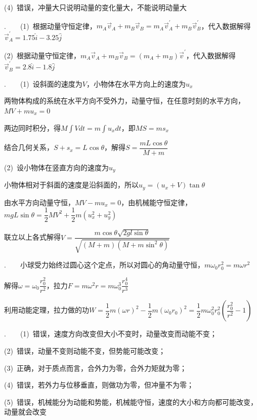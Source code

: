 (4)~错误，冲量大只说明动量的变化量大，不能说明动量大

\noindent\hdashrule{\textwidth}{1pt}{1pt}

.~~~~(1)~根据动量守恒定律，$m_A\vec{v}_A+m_B\vec{v}_B=m_A\vec{v}^\prime_A+m_B\vec{v}^\prime_B$，代入数据解得$\vec{v}^\prime_A=1.75\hat{i}-3.25\hat{j}$

(2)~根据动量守恒定律，$m_A\vec{v}_A+m_B\vec{v}_B=(m_A+m_B)\vec{v}^\prime$，代入数据解得$\vec{v}^\prime_B=2.8\hat{i}-1.8\hat{j}$

\noindent\hdashrule{\textwidth}{1pt}{1pt}

.~~~~(1)~设斜面的速度为$V$，小物体在水平方向上的速度为$u_x$

两物体构成的系统在水平方向不受外力，动量守恒，在任意时刻的水平方向，$MV+mu_x=0$

两边同时积分，得$\displaystyle M\int Vdt=m\int u_xdt$，即$MS=ms_x$

结合几何关系，$S+s_x=L\cos\theta$，解得$S=\dfrac{mL\cos\theta}{M+m}$

(2)~设小物体在竖直方向的速度为$u_y$

小物体相对于斜面的速度是沿斜面的，所以$u_y=(u_x+V)\tan \theta$

由水平方向动量守恒，$MV-mu_x=0$，由机械能守恒定律，$mgL\sin\theta=\dfrac{1}{2}MV^2+\dfrac{1}{2}m(u_x^2+u_y^2)$

联立以上各式解得$V=\dfrac{m\cos\theta \sqrt{2gl\sin\theta}}{\sqrt{(M+m)(M+m\sin^2\theta)}}$

\noindent\hdashrule{\textwidth}{1pt}{1pt}

.~~~~小球受力始终过圆心这个定点，所以对圆心的角动量守恒，$m\omega_0r_0^2=m\omega r^2$

解得$\omega=\omega_0 \dfrac{r_0^2}{r^2}$，拉力$F=m\omega^2r=m\omega_0^3\dfrac{r_0^4}{r^3}$

利用动能定理，拉力做的功$W=\dfrac{1}{2}m(\omega r)^2-\dfrac{1}{2}m(\omega_0 r_0)^2=\dfrac{1}{2}m\omega_0^2 r_0^2\left(\dfrac{r_0^2}{r^2}-1\right)$


.~~~~(1)~错误，速度方向改变但大小不变时，动量改变而动能不变；

(2)~错误，动量不变则动能不变，但势能可能改变；

(3)~正确，对于质点而言，合外力为零，合外力矩就为零；

(4)~错误，若外力与位移垂直，则做功为零，但冲量不为零；

(5)~错误，机械能分为动能和势能，机械能守恒，速度的大小和方向都可能改变，动量就会改变

